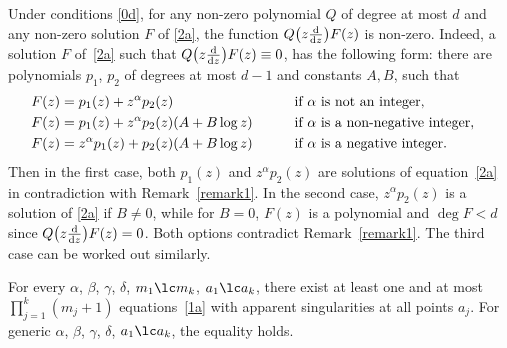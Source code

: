 \begin{Remark}\label{remark2} Under conditions \eqref{0d}, for any non-zero polynomial $Q$ of degree at most $d$ and any non-zero solution $F$ of \eqref{2a}, the function $Q\big(z\frac{{\rm d}}{{\rm d}z}\big)F(z)$ is non-zero. Indeed, a solution $F$ of~\eqref{2a} such that $Q\big(z\frac{{\rm d}}{{\rm d}z}\big)F(z)\equiv 0$, has the following form: there are polynomials $p_1$, $p_2$ of degrees at most $d-1$ and constants $A,B$, such that
\begin{alignat*}{3}
& F(z) = p_1(z) + z^\alpha p_2(z)\qquad && \hbox{\rm if $\alpha$ is not an integer},&\\
& F(z) = p_1(z) + z^\alpha p_2(z) (A+B\log z)\qquad && \hbox{\rm if $\alpha$ is a non-negative integer},&\\
& F(z) = z^\alpha p_1(z) + p_2(z) (A+B\log z)\qquad && \hbox{\rm if $\alpha$ is a negative integer}. &
\end{alignat*}
Then in the first case, both $p_1(z)$ and $z^\alpha p_2(z)$ are solutions of equation~\eqref{2a} in contradiction with Remark~\ref{remark1}. In the second case, $z^\alpha p_2(z)$ is a solution of \eqref{2a} if $B\ne 0$, while for $B=0$, $F(z)$ is a polynomial and $ \deg F<d$ since $Q\big(z\frac{{\rm d}}{{\rm d}z}\big)F(z)=0$. Both options contradict Remark~\ref{remark1}. The third case can be worked out similarly.
\end{Remark}

\begin{thm}\label{theorem2}
For every $\alpha$, $\beta$, $\gamma$, $\delta$, $m_1\lc m_k$, $a_1\lc a_k$, there exist at least one and at most $\prod\limits_{j=1}^k(m_j+1)$ equations~\eqref{1a} with apparent singularities at all points $a_j$. For generic $\alpha$, $\beta$, $\gamma$, $\delta$, $a_1\lc a_k$, the equality holds.
\end{thm}
